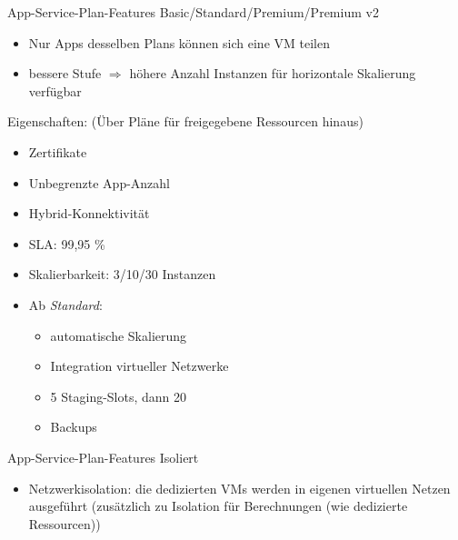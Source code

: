 \begin{flashcard}[Definition]{App-Service-Plan-Features Basic/Standard/Premium/Premium v2}
    \begin{itemize}
        \item Nur Apps desselben Plans können sich eine VM teilen
        \item bessere Stufe $\Rightarrow$ höhere Anzahl Instanzen für horizontale Skalierung verfügbar
    \end{itemize}
    Eigenschaften: (Über Pläne für freigegebene Ressourcen hinaus)
    \begin{itemize}
        \item Zertifikate\vspace{-0.5mm}
        \item Unbegrenzte App-Anzahl\vspace{-0.5mm}
        \item Hybrid-Konnektivität\vspace{-0.5mm}
        \item SLA: 99,95 \%\vspace{-0.5mm}
        \item Skalierbarkeit: 3/10/30 Instanzen\vspace{-0.5mm}
        \item Ab \emph{Standard}:\vspace{-1mm}
            \begin{itemize}
                \item automatische Skalierung\vspace{-1mm}
                \item Integration virtueller Netzwerke\vspace{-1mm}
                \item 5 Staging-Slots, dann 20\vspace{-1mm}
                \item Backups\vspace{-1mm}
            \end{itemize}
    \end{itemize}
\end{flashcard}

\begin{flashcard}[Definition]{App-Service-Plan-Features Isoliert}
    \begin{itemize}
        \item Netzwerkisolation: die dedizierten VMs werden in eigenen virtuellen Netzen ausgeführt\newline
            (zusätzlich zu Isolation für Berechnungen (wie dedizierte Ressourcen))
    \end{itemize}
\end{flashcard}

